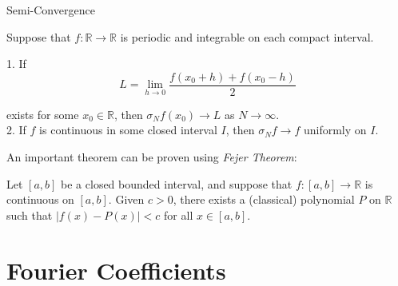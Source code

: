 \documentclass{beamer}
\begin{document}
\begin{frame}{Semi-Convergence}
\small
\begin{theorem}[Fejer]
    Suppose that $f: \mathbb{R} \to \mathbb{R}$ is periodic and integrable on each compact interval.
    
        1. If \begin{equation*}
             L = \lim_{h \to 0} \frac{f(x_0 + h) + f(x_0 - h)}{2}
        \end{equation*}
       
        exists for some $x_0 \in \mathbb{R}$, then $\sigma_Nf(x_0) \to L$ as $N \to \infty$.   \\
        2. If \(f\) is continuous in some closed interval $I$, then $\sigma_Nf \to f$ uniformly on $I$.
    
\end{theorem}

An important theorem can be proven using \textit{Fejer Theorem}:
\begin{theorem}
Let $[a, b]$ be a closed bounded interval, and suppose that $f : [a, b] \rightarrow \mathbb{R}$ is continuous on $[a, b]$. Given $c > 0$, there exists a (classical) polynomial $P$ on $\mathbb{R}$ such that $|f(x) - P(x)| < c$ for all $x \in [a, b]$.
    
\end{theorem}
\end{frame}



\section{Fourier Coefficients}
\end{document}
